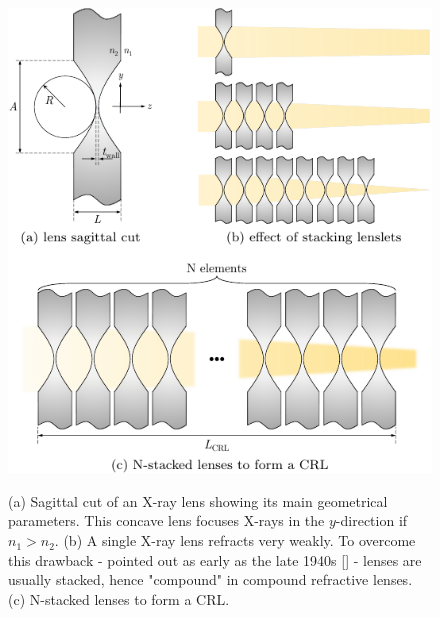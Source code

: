 \begin{refsection}
\begin{figure}[t]
    \centering
    {\includegraphics[width=0.5\linewidth]{figures/ch03/anatomy.pdf}}
    \caption[CRL anatomy]{(a) Sagittal cut of an X-ray lens showing its main geometrical parameters. This concave lens focuses X-rays in the $y$-direction if $n_1>n_2$. (b) A single X-ray lens refracts very weakly. To overcome this drawback - pointed out as early as the late 1940s [\cite{Kirkpatrick1948}] - lenses are usually stacked, hence "compound" in compound refractive lenses. (c) N-stacked lenses to form a CRL.}
    \label{fig:CRLs}
\end{figure}


\end{refsection}
